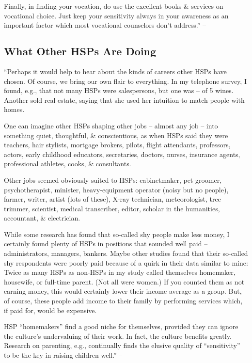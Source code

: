 \documentclass{article}
\numberwithin{equation}{section}
\begin{document}
Finally, in finding your vocation, do use the excellent books \& services on vocational choice. Just keep your sensitivity always in your awareness as an important factor which most vocational counselors don't address.'' -- \cite[pp. 151--153]{Aron2013}

\subsection{What Other HSPs Are Doing}
``Perhaps it would help to hear about the kinds of careers other HSPs have chosen. Of course, we bring our own flair to everything. In my telephone survey, I found, e.g., that not many HSPs were salespersons, but one was -- of 5 wines. Another sold real estate, saying that she used her intuition to match people with homes.

One can imagine other HSPs shaping other jobs -- almost any job -- into something quiet, thoughtful, \& conscientious, as when HSPs said they were teachers, hair stylists, mortgage brokers, pilots, flight attendants, professors, actors, early childhood educators, secretaries, doctors, nurses, insurance agents, professional athletes, cooks, \& consultants.

Other jobs seemed obviously suited to HSPs: cabinetmaker, pet groomer, psychotherapist, minister, heavy-equipment operator (noisy but no people), farmer, writer, artist (lots of these), X-ray technician, meteorologist, tree trimmer, scientist, medical transcriber, editor, scholar in the humanities, accountant, \& electrician.

While some research has found that so-called shy people make less money, I certainly found plenty of HSPs in positions that sounded well paid -- administrators, managers, bankers. Maybe other studies found that their so-called shy respondents were poorly paid because of a quirk in their data similar to mine: Twice as many HSPs as non-HSPs in my study called themselves homemaker, housewife, or full-time parent. (Not all were women.) If you counted them as not earning money, this would certainly lower their income average as a group. But, of course, these people add income to their family by performing services which, if paid for, would be expensive.

HSP ``homemakers'' find a good niche for themselves, provided they can ignore the culture's undervaluing of their work. In fact, the culture benefits greatly. Research on parenting, e.g., continually finds the elusive quality of ``sensitivity'' to be the key in raising children well.'' -- \cite[pp. 153--154]{Aron2013}
\end{document}
